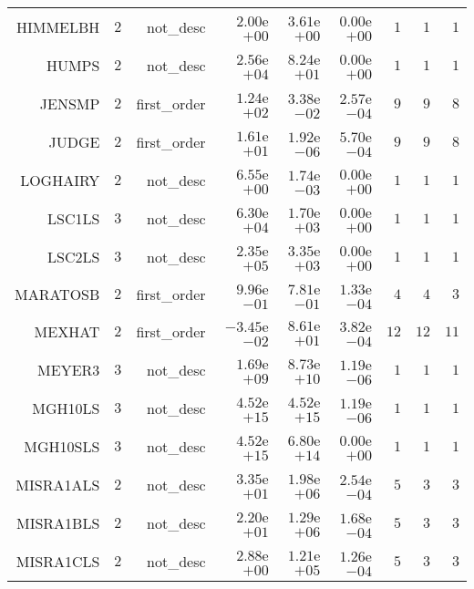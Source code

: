 \begin{longtable}{rrrrrrrrr}
HIMMELBH & \(     2\) & not\_desc & \( 2.00\)e\(+00\) & \( 3.61\)e\(+00\) & \( 0.00\)e\(+00\) & \(     1\) & \(     1\) & \(     1\) \\
HUMPS & \(     2\) & not\_desc & \( 2.56\)e\(+04\) & \( 8.24\)e\(+01\) & \( 0.00\)e\(+00\) & \(     1\) & \(     1\) & \(     1\) \\
JENSMP & \(     2\) & first\_order & \( 1.24\)e\(+02\) & \( 3.38\)e\(-02\) & \( 2.57\)e\(-04\) & \(     9\) & \(     9\) & \(     8\) \\
JUDGE & \(     2\) & first\_order & \( 1.61\)e\(+01\) & \( 1.92\)e\(-06\) & \( 5.70\)e\(-04\) & \(     9\) & \(     9\) & \(     8\) \\
LOGHAIRY & \(     2\) & not\_desc & \( 6.55\)e\(+00\) & \( 1.74\)e\(-03\) & \( 0.00\)e\(+00\) & \(     1\) & \(     1\) & \(     1\) \\
LSC1LS & \(     3\) & not\_desc & \( 6.30\)e\(+04\) & \( 1.70\)e\(+03\) & \( 0.00\)e\(+00\) & \(     1\) & \(     1\) & \(     1\) \\
LSC2LS & \(     3\) & not\_desc & \( 2.35\)e\(+05\) & \( 3.35\)e\(+03\) & \( 0.00\)e\(+00\) & \(     1\) & \(     1\) & \(     1\) \\
MARATOSB & \(     2\) & first\_order & \( 9.96\)e\(-01\) & \( 7.81\)e\(-01\) & \( 1.33\)e\(-04\) & \(     4\) & \(     4\) & \(     3\) \\
MEXHAT & \(     2\) & first\_order & \(-3.45\)e\(-02\) & \( 8.61\)e\(+01\) & \( 3.82\)e\(-04\) & \(    12\) & \(    12\) & \(    11\) \\
MEYER3 & \(     3\) & not\_desc & \( 1.69\)e\(+09\) & \( 8.73\)e\(+10\) & \( 1.19\)e\(-06\) & \(     1\) & \(     1\) & \(     1\) \\
MGH10LS & \(     3\) & not\_desc & \( 4.52\)e\(+15\) & \( 4.52\)e\(+15\) & \( 1.19\)e\(-06\) & \(     1\) & \(     1\) & \(     1\) \\
MGH10SLS & \(     3\) & not\_desc & \( 4.52\)e\(+15\) & \( 6.80\)e\(+14\) & \( 0.00\)e\(+00\) & \(     1\) & \(     1\) & \(     1\) \\
MISRA1ALS & \(     2\) & not\_desc & \( 3.35\)e\(+01\) & \( 1.98\)e\(+06\) & \( 2.54\)e\(-04\) & \(     5\) & \(     3\) & \(     3\) \\
MISRA1BLS & \(     2\) & not\_desc & \( 2.20\)e\(+01\) & \( 1.29\)e\(+06\) & \( 1.68\)e\(-04\) & \(     5\) & \(     3\) & \(     3\) \\
MISRA1CLS & \(     2\) & not\_desc & \( 2.88\)e\(+00\) & \( 1.21\)e\(+05\) & \( 1.26\)e\(-04\) & \(     5\) & \(     3\) & \(     3\) \\

\end{longtable}
